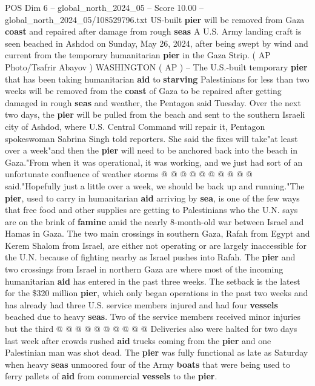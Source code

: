 \begin{textsample}{POS Dim 6 – global\_north\_2024\_05 – Score 10.00 – global\_north\_2024\_05/108529796.txt}  \label{ex:f6_pos_143}
US-built \textbf{pier} will be removed from Gaza \textbf{coast} and repaired after damage from rough \textbf{seas} A U.S.
Army landing craft is seen beached in Ashdod on Sunday, May 26, 2024, after being swept by wind and current from the temporary humanitarian \textbf{pier} in the Gaza Strip. ( AP Photo/Tsafrir Abayov ) WASHINGTON ( AP ) -- The U.S.-built temporary \textbf{pier} that has been taking humanitarian \textbf{aid} to \textbf{starving} Palestinians for less than two weeks will be removed from the \textbf{coast} of Gaza to be repaired after getting damaged in rough \textbf{seas} and weather, the Pentagon said Tuesday.
Over the next two days, the \textbf{pier} will be pulled from the beach and sent to the southern Israeli city of Ashdod, where U.S.
Central Command will repair it, Pentagon spokeswoman Sabrina Singh told reporters.
She said the fixes will take"at least over a week"and then the \textbf{pier} will need to be anchored back into the beach in Gaza."From when it was operational, it was working, and we just had sort of an unfortunate confluence of weather storms @ @ @ @ @ @ @ @ @ @ said."Hopefully just a little over a week, we should be back up and running."The \textbf{pier}, used to carry in humanitarian \textbf{aid} arriving by \textbf{sea}, is one of the few ways that free food and other supplies are getting to Palestinians who the U.N. says are on the brink of \textbf{famine} amid the nearly 8-month-old war between Israel and Hamas in Gaza.
The two main crossings in southern Gaza, Rafah from Egypt and Kerem Shalom from Israel, are either not operating or are largely inaccessible for the U.N. because of fighting nearby as Israel pushes into Rafah.
The \textbf{pier} and two crossings from Israel in northern Gaza are where most of the incoming humanitarian \textbf{aid} has entered in the past three weeks.
The setback is the latest for the \$320 million \textbf{pier}, which only began operations in the past two weeks and has already had three U.S. service members injured and had four \textbf{vessels} beached due to heavy \textbf{seas}.
Two of the service members received minor injuries but the third @ @ @ @ @ @ @ @ @ @ Deliveries also were halted for two days last week after crowds rushed \textbf{aid} trucks coming from the \textbf{pier} and one Palestinian man was shot dead.
The \textbf{pier} was fully functional as late as Saturday when heavy \textbf{seas} unmoored four of the Army \textbf{boats} that were being used to ferry pallets of \textbf{aid} from commercial \textbf{vessels} to the \textbf{pier}.

\end{textsample}
